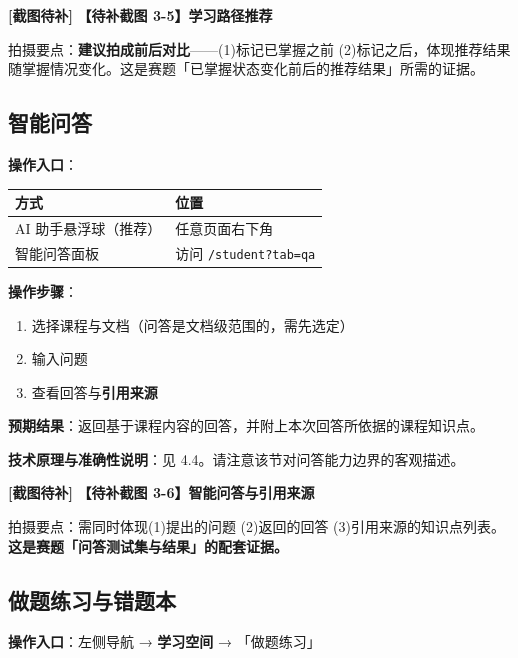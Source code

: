 \documentclass[UTF8,a4paper,11pt]{ctexrep}
\newcommand{\shotmark}{\textcolor{todobar}{\textbf{[截图待补]}}}
\begin{document}
\begin{todobox}
\shotmark{} \textbf{【待补截图 3-5】学习路径推荐}

拍摄要点：\textbf{建议拍成前后对比}——(1)标记已掌握之前 (2)标记之后，体现推荐结果随掌握情况变化。这是赛题「已掌握状态变化前后的推荐结果」所需的证据。

\end{todobox}


\subsection{智能问答}

\textbf{操作入口}：

\begin{center}
\small
\begin{tabularx}{\linewidth}{@{}XX@{}}
\toprule
方式 & 位置 \\
\midrule
AI 助手悬浮球（推荐） & 任意页面右下角 \\
智能问答面板 & 访问 \texttt{/student?tab=qa} \\
\bottomrule
\end{tabularx}
\end{center}
\textbf{操作步骤}：

\begin{enumerate}
\item 选择课程与文档（问答是文档级范围的，需先选定）
\item 输入问题
\item 查看回答与\textbf{引用来源}
\end{enumerate}
\textbf{预期结果}：返回基于课程内容的回答，并附上本次回答所依据的课程知识点。

\textbf{技术原理与准确性说明}：见 4.4。请注意该节对问答能力边界的客观描述。

\begin{todobox}
\shotmark{} \textbf{【待补截图 3-6】智能问答与引用来源}

拍摄要点：需同时体现(1)提出的问题 (2)返回的回答 (3)引用来源的知识点列表。\textbf{这是赛题「问答测试集与结果」的配套证据。}

\end{todobox}


\subsection{做题练习与错题本}

\textbf{操作入口}：左侧导航 → \textbf{学习空间} → 「做题练习」
\end{document}
